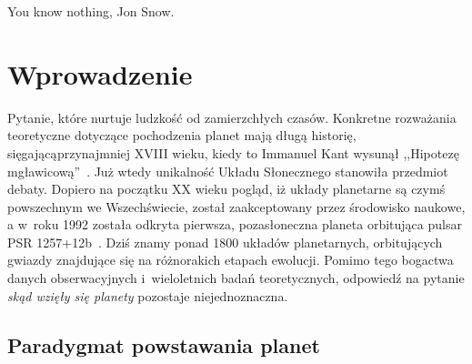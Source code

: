 \begin{savequote}[75mm]
   You know nothing, Jon Snow.
\end{savequote}

\chapter{Wprowadzenie}
 Pytanie, które nurtuje ludzkość od
zamierzchłych czasów. Konkretne rozważania teoretyczne dotyczące pochodzenia
planet mają długą historię, sięgającą\linebreak przynajmniej XVIII wieku, kiedy
to Immanuel Kant wysunął ,,Hipotezę mgławicową''~\cite{ImmanuelKant.etal:2008}.
Już wtedy unikalność Układu Słonecznego stanowiła przedmiot debaty. Dopiero na
początku XX wieku pogląd, iż układy planetarne są czymś powszechnym we
Wszechświecie, został zaakceptowany przez środowisko naukowe, a w~roku 1992
została odkryta pierwsza, pozasłoneczna planeta orbitująca pulsar PSR
1257+12b~\cite{1992Natur.355..145W}. Dziś znamy ponad 1800 układów planetarnych,
orbitujących gwiazdy znajdujące się na różnorakich etapach ewolucji. Pomimo tego
bogactwa danych obserwacyjnych i~wieloletnich badań teoretycznych, odpowiedź na
pytanie \emph{skąd wzięły się planety} pozostaje niejednoznaczna.

\section{Paradygmat powstawania planet}
\label{sec:paradigm}
